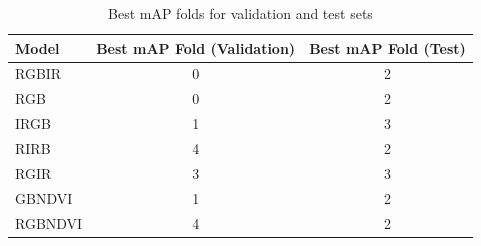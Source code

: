 



\begin{table}[h!]
\centering

\begin{tabular}{lcc}
\hline
\textbf{Model} & \textbf{Best mAP Fold (Validation)} & \textbf{Best mAP Fold (Test)} \\ \hline
RGBIR    & 0 & 2 \\
RGB      & 0 & 2 \\
IRGB     & 1 & 3 \\
RIRB     & 4 & 2 \\
RGIR     & 3 & 3 \\
GBNDVI   & 1 & 2 \\
RGBNDVI  & 4 & 2 \\ \hline
\end{tabular}
\caption{Best mAP folds for validation and test sets}
\label{tab:best_map_fold_perm_exp}
\end{table}



